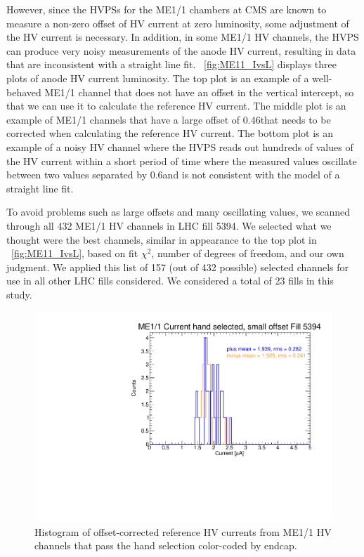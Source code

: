 However, since the HVPSs for the ME1/1 chambers at CMS are known to measure a non-zero offset of HV current at zero luminosity, some adjustment of the HV current is necessary. In addition, in some ME1/1 HV channels, the HVPS can produce very noisy measurements of the anode HV current, resulting in data that are inconsistent with a straight line fit. \Fig~\ref{fig:ME11_IvsL} displays three plots of anode HV current \vs luminosity. The top plot is an example of a well-behaved ME1/1 channel that does not have an offset in the vertical intercept, so that we can use it to calculate the reference HV current. The middle plot is an example of ME1/1 channels that have a large offset of 0.46\muA that needs to be corrected when calculating the reference HV current. The bottom plot is an example of a noisy HV channel where the HVPS reads out hundreds of values of the HV current within a short period of time where the measured values oscillate between two values separated by 0.6\muA and is not consistent with the model of a straight line fit.

To avoid problems such as large offsets and many oscillating values, we scanned through all 432 ME1/1 HV channels in LHC fill 5394. We selected what we thought were the best channels, similar in appearance to the top plot in \FigDot~\ref{fig:ME11_IvsL}, based on fit $\chi^{2}$, number of degrees of freedom, and our own judgment. We applied this list of 157 (out of 432 possible) selected channels for use in all other LHC fills considered. We considered a total of 23 fills in this study. 

\begin{figure}
	\centering
	\includegraphics[width=\dummyFigWidth]{figures/neutron/me11_fill_5394_a_sel_slope_hist.pdf}
	\caption{Histogram of offset-corrected reference HV currents from ME1/1 HV channels that pass the hand selection color-coded by endcap.}
	\label{fig:fill_5394_curr_histo}
\end{figure}

